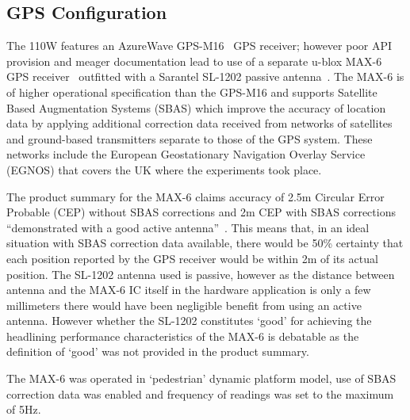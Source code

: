 \subsection{GPS Configuration}
The 110W features an AzureWave GPS-M16~\cite{AzureWave} GPS receiver; however poor API provision and meager documentation lead to use of a separate u-blox MAX-6 GPS receiver~\cite{U-bloxAG} outfitted with a Sarantel SL-1202 passive antenna~\cite{Sarantel}. The MAX-6 is of higher operational specification than the GPS-M16 and supports Satellite Based Augmentation Systems (SBAS) which improve the accuracy of location data by applying additional correction data received from networks of satellites and ground-based transmitters separate to those of the GPS system. These networks include the European Geostationary Navigation Overlay Service (EGNOS) that covers the UK where the experiments took place.

The product summary for the MAX-6 claims accuracy of 2.5m Circular Error Probable (CEP) without SBAS corrections and 2m CEP with SBAS corrections ``demonstrated with a good active antenna''~\cite{U-bloxAG2012}. This means that, in an ideal situation with SBAS correction data available, there would be 50\% certainty that each position reported by the GPS receiver would be within 2m of its actual position. The SL-1202 antenna used is passive, however as the distance between antenna and the MAX-6 IC itself in the hardware application is only a few millimeters there would have been negligible benefit from using an active antenna. However whether the SL-1202 constitutes `good' for achieving the headlining performance characteristics of the MAX-6 is debatable as the definition of `good' was not provided in the product summary.

The MAX-6 was operated in `pedestrian' dynamic platform model, use of SBAS correction data was enabled and frequency of readings was set to the maximum of 5Hz.


